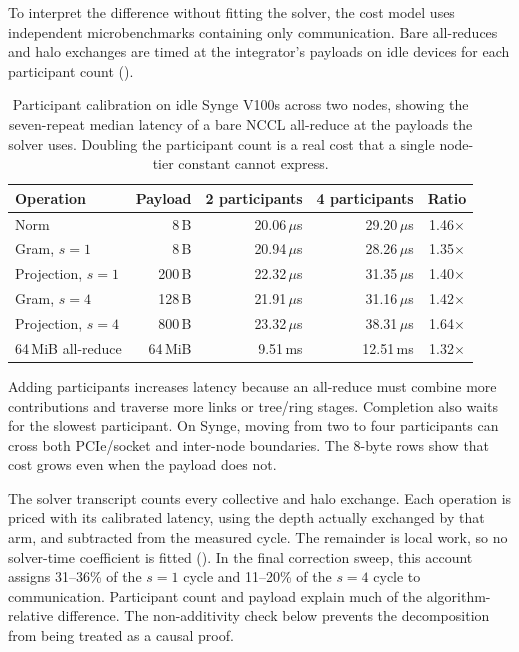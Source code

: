 To interpret the difference without fitting the solver, the cost model uses independent microbenchmarks containing only communication. Bare all-reduces and halo exchanges are timed at the integrator's payloads on idle devices for each participant count ().

\begin{table}[htbp!]
\centering
\caption{Participant calibration on idle Synge V100s across two nodes, showing the seven-repeat median latency of a bare NCCL all-reduce at the payloads the solver uses. Doubling the participant count is a real cost that a single node-tier constant cannot express.}
\label{tab:ca-participants}
\begin{tabular}{@{}lrrrc@{}}
\toprule
\textbf{Operation} & \textbf{Payload} & \textbf{2 participants} & \textbf{4 participants} & \textbf{Ratio} \\
\midrule
Norm                & 8\,B    & 20.06\,$\mu$s & 29.20\,$\mu$s & 1.46$\times$ \\
Gram, $s{=}1$       & 8\,B    & 20.94\,$\mu$s & 28.26\,$\mu$s & 1.35$\times$ \\
Projection, $s{=}1$ & 200\,B  & 22.32\,$\mu$s & 31.35\,$\mu$s & 1.40$\times$ \\
Gram, $s{=}4$       & 128\,B  & 21.91\,$\mu$s & 31.16\,$\mu$s & 1.42$\times$ \\
Projection, $s{=}4$ & 800\,B  & 23.32\,$\mu$s & 38.31\,$\mu$s & 1.64$\times$ \\
64\,MiB all-reduce  & 64\,MiB & 9.51\,ms      & 12.51\,ms     & 1.32$\times$ \\
\bottomrule
\end{tabular}
\end{table}

Adding participants increases latency because an all-reduce must combine more contributions and traverse more links or tree/ring stages. Completion also waits for the slowest participant. On Synge, moving from two to four participants can cross both PCIe/socket and inter-node boundaries. The 8-byte rows show that cost grows even when the payload does not.

The solver transcript counts every collective and halo exchange. Each operation is priced with its calibrated latency, using the depth actually exchanged by that arm, and subtracted from the measured cycle. The remainder is local work, so no solver-time coefficient is fitted (). In the final correction sweep, this account assigns 31--36\% of the $s=1$ cycle and 11--20\% of the $s=4$ cycle to communication. Participant count and payload explain much of the algorithm-relative difference. The non-additivity check below prevents the decomposition from being treated as a causal proof.


